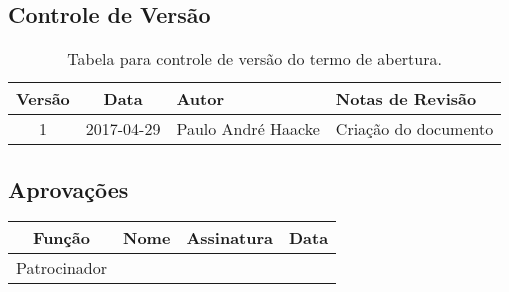 

\subsection{Controle de Versão}

\begin{table}[H]
	\begin{tabularx}{.9\textwidth}{| c | c | X | X |}
		\hline
		\textbf{Versão} & \textbf{Data} & \textbf{Autor}      & \textbf{Notas de Revisão} \\
		\hline
		1                & 2017-04-29    & Paulo André Haacke & Criação do documento     \\
		\hline
	\end{tabularx}
	\centering
	\caption{Tabela para controle de versão do termo de abertura.}
\end{table}

\subsection{Aprovações}

\begin{table}[H]
	\begin{tabularx}{\textwidth}{| c | c | X | c |}
		\hline
		\textbf{Função} & \textbf{Nome}       & \textbf{Assinatura}      & \textbf{Data} \\
		\hline
		Patrocinador      & \projectSponsorName & \projectSponsorSignature &               \\
		\hline
	\end{tabularx}
	\centering
\end{table}